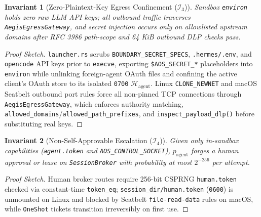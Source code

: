 \documentclass[10pt,journal,compsoc]{IEEEtran}
\newtheorem{invariant}{Invariant}
\begin{document}
\begin{invariant}[Zero-Plaintext-Key Egress Confinement ($\mathcal{I}_3$)]
\label{inv:egress}
Sandbox \texttt{environ} holds zero raw LLM API keys; all outbound traffic traverses \texttt{AegisEgressGateway}, and secret injection occurs only on allowlisted upstream domains after RFC 3986 path-scope and 64 KiB outbound DLP checks pass.
\end{invariant}
\begin{proof}[Proof Sketch]
\texttt{launcher.rs} scrubs \texttt{BOUNDARY\_SECRET\_SPECS}, \texttt{.hermes/.env}, and \texttt{opencode} API keys prior to \texttt{execve}, exporting \texttt{\$AOS\_SECRET\_*} placeholders into \texttt{environ} while unlinking foreign-agent OAuth files and confining the active client's OAuth store to its isolated \texttt{0700} $\mathcal{H}_{\text{agent}}$. Linux \texttt{CLONE\_NEWNET} and macOS Seatbelt outbound port rules force all non-pinned TCP connections through \texttt{AegisEgressGateway}, which enforces authority matching, \texttt{allowed\_domains}/\texttt{allowed\_path\_prefixes}, and \texttt{inspect\_payload\_dlp()} before substituting real keys.
\end{proof}

\begin{invariant}[Non-Self-Approvable Escalation ($\mathcal{I}_4$)]
\label{inv:broker}
Given only in-sandbox capabilities (\texttt{agent.token} and \texttt{AOS\_CONTROL\_SOCKET}), $p_{\text{agent}}$ forges a human approval or lease on \texttt{SessionBroker} with probability at most $2^{-256}$ per attempt.
\end{invariant}
\begin{proof}[Proof Sketch]
Human broker routes require 256-bit CSPRNG \texttt{human.token} checked via constant-time \texttt{token\_eq}; \texttt{session\_dir/human.token} (\texttt{0600}) is unmounted on Linux and blocked by Seatbelt \texttt{file-read-data} rules on macOS, while \texttt{OneShot} tickets transition irreversibly on first use.
\end{proof}
\end{document}
